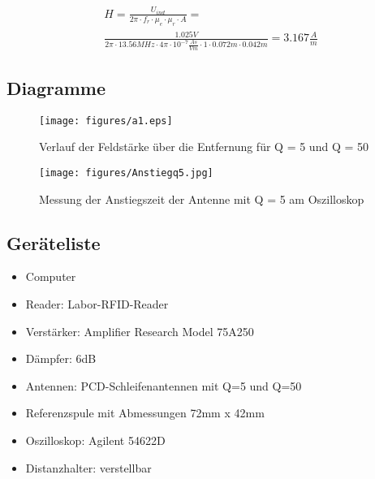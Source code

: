 \documentclass[12pt,a4paper,ngerman]{article}
\begin{document}
\begin{gather}
H = \frac{U_{ind}}{2\pi \cdot f_r \cdot \mu_e \cdot \mu_r \cdot A} = \\
\frac{1.025V}{2\pi \cdot 13.56MHz \cdot 4\pi \cdot 10^{-7}\frac{As}{Vm} \cdot 1 \cdot 0.072m \cdot 0.042m} = 3.167\frac{A}{m}
\end{gather}

\subsection{Diagramme}
\begin{figure}[H]
\centering
\texttt{[image: figures/a1.eps]} 
\caption{Verlauf der Feldstärke über die Entfernung für Q = 5 und Q = 50}
\label{fig:1_q5}
\end{figure}

\begin{figure}[H]
\centering
\texttt{[image: figures/Anstiegq5.jpg]} 
\caption{Messung der Anstiegszeit der Antenne mit Q = 5 am Oszilloskop}
\label{fig:1_anstieg}
\end{figure}

\subsection{Geräteliste}
\begin{itemize}
\item Computer
\item Reader: Labor-RFID-Reader
\item Verstärker: Amplifier Research Model 75A250
\item Dämpfer: 6dB
\item Antennen: PCD-Schleifenantennen mit Q=5 und Q=50
\item Referenzspule mit Abmessungen 72mm x 42mm
\item Oszilloskop: Agilent 54622D
\item Distanzhalter: verstellbar
\end{itemize}
\pagebreak
\end{document}
